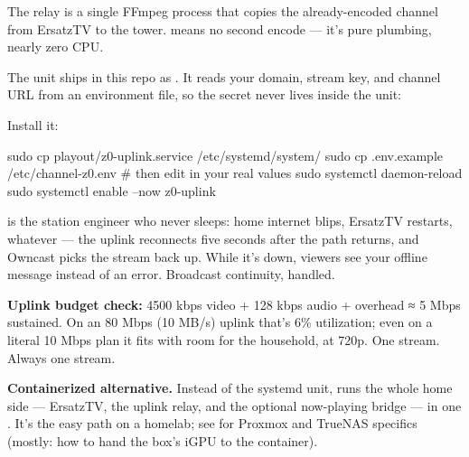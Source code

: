 \documentclass[fontpath=fonts/,logopath=logo/]{riposte-doc}
\begin{document}
The relay is a single FFmpeg process that copies the already-encoded channel from ErsatzTV to the tower.  means no second encode — it's pure plumbing, nearly zero CPU.

The unit ships in this repo as . It reads your domain, stream key, and channel URL from an environment file, so the secret never lives inside the unit:

\ripcodeopen
{}
\ripcodesizereset\ripcodeclose

Install it:

\ripcodeopen
{}
\begin{ripcodeblock}
sudo cp playout/z0-uplink.service /etc/systemd/system/
sudo cp .env.example /etc/channel-z0.env   # then edit in your real values
sudo systemctl daemon-reload
sudo systemctl enable --now z0-uplink
\end{ripcodeblock}
\ripcodesizereset\ripcodeclose

 is the station engineer who never sleeps: home internet blips, ErsatzTV restarts, whatever — the uplink reconnects five seconds after the path returns, and Owncast picks the stream back up. While it's down, viewers see your offline message instead of an error. Broadcast continuity, handled.

\textbf{Uplink budget check:} 4500 kbps video + 128 kbps audio + overhead ≈ 5 Mbps sustained. On an 80 Mbps (10 MB/s) uplink that's 6\% utilization; even on a literal 10 Mbps plan it fits with room for the household, at 720p. One stream. Always one stream.

\textbf{Containerized alternative.} Instead of the systemd unit,  runs the whole home side — ErsatzTV, the uplink relay, and the optional now-playing bridge — in one . It's the easy path on a homelab; see  for Proxmox and TrueNAS specifics (mostly: how to hand the box's iGPU to the container).
\end{document}
